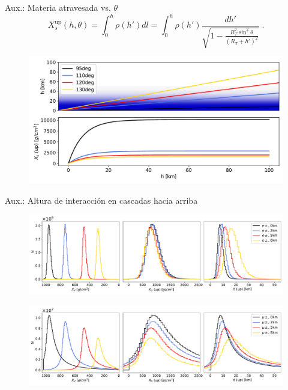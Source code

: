\documentclass{beamer}
\begin{document}
\begin{frame}[noframenumbering]{Aux.: Materia atravesada vs. $\theta$}
	$$X_{s}^\text{up}(h,\theta)=\int_{0}^h\rho(h')dl=\int_0^{h}\rho(h')\frac{dh'}{\sqrt{1-\frac{R_T^2\sin^2{\theta}}{\left(R_T+h'\right)^2}}}\;.$$
	\begin{figure}[H]
		\centering
		\includegraphics[width=.8\linewidth]{figures/cascadas/ProfAtravesadavsang}
	\end{figure}
\end{frame}
\begin{frame}[noframenumbering]{Aux.: Altura de interacción en cascadas hacia arriba}
		\begin{figure}[H]
	\centering
	\includegraphics[width=.95\linewidth]{figures/cascadas/upgoing_p_1EeV_95deg_varh_e_v2}
\end{figure}
\begin{figure}[H]
	\centering
	\includegraphics[width=.95\linewidth]{figures/cascadas/upgoing_p_1EeV_95deg_varh_mu_v2}
\end{figure}
\end{frame}
\end{document}
